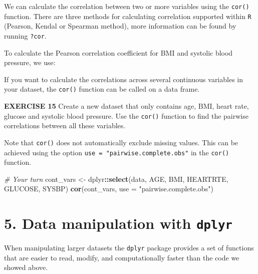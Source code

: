 \documentclass[
]{article}
\newenvironment{Shaded}{\begin{snugshade}}{\end{snugshade}}
\newcommand{\CommentTok}[1]{\textcolor[rgb]{0.56,0.35,0.01}{\textit{#1}}}
\newcommand{\DataTypeTok}[1]{\textcolor[rgb]{0.13,0.29,0.53}{#1}}
\newcommand{\KeywordTok}[1]{\textcolor[rgb]{0.13,0.29,0.53}{\textbf{#1}}}
\newcommand{\NormalTok}[1]{#1}
\newcommand{\OperatorTok}[1]{\textcolor[rgb]{0.81,0.36,0.00}{\textbf{#1}}}
\newcommand{\StringTok}[1]{\textcolor[rgb]{0.31,0.60,0.02}{#1}}
\begin{document}
We can calculate the correlation between two or more variables using the
\texttt{cor()} function. There are three methods for calculating
correlation supported within \texttt{R} (Pearson, Kendal or Spearman
method), more information can be found by running \texttt{?cor}.

To calculate the Pearson correlation coefficient for BMI and systolic
blood pressure, we use:

\begin{Shaded}
\end{Shaded}

If you want to calculate the correlations across several continuous
variables in your dataset, the \texttt{cor()} function can be called on
a data frame.

\textbf{EXERCISE 15} Create a new dataset that only contains age, BMI,
heart rate, glucose and systolic blood pressure. Use the \texttt{cor()}
function to find the pairwise correlations between all these variables.

Note that \texttt{cor()} does not automatically exclude missing values.
This can be achieved using the option
\texttt{use\ =\ "pairwise.complete.obs"} in the \texttt{cor()} function.

\begin{Shaded}
\begin{Highlighting}[]
\CommentTok{# Your turn}
\NormalTok{cont_vars <-}\StringTok{ }\NormalTok{dplyr}\OperatorTok{::}\KeywordTok{select}\NormalTok{(data, AGE, BMI, HEARTRTE, GLUCOSE, SYSBP)}
\KeywordTok{cor}\NormalTok{(cont_vars, }\DataTypeTok{use =} \StringTok{"pairwise.complete.obs"}\NormalTok{)}
\end{Highlighting}
\end{Shaded}

\hypertarget{data-manipulation-with-dplyr}{%
\section{\texorpdfstring{5. Data manipulation with
\texttt{dplyr}}{5. Data manipulation with dplyr}}\label{data-manipulation-with-dplyr}}

When manipulating larger datasets the \texttt{dplyr} package provides a
set of functions that are easier to read, modify, and computationally
faster than the code we showed above.
\end{document}
